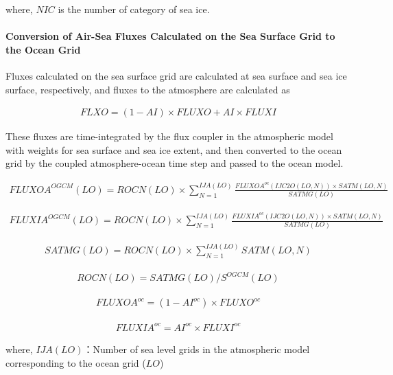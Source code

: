 where, \(NIC\) is the number of category of sea ice.

\hypertarget{conversion-of-air-sea-fluxes-calculated-on-the-sea-surface-grid-to-the-ocean-grid}{%
\paragraph{Conversion of Air-Sea Fluxes Calculated on the Sea Surface
Grid to the Ocean
Grid}\label{conversion-of-air-sea-fluxes-calculated-on-the-sea-surface-grid-to-the-ocean-grid}}

Fluxes calculated on the sea surface grid are calculated at sea surface
and sea ice surface, respectively, and fluxes to the atmosphere are
calculated as

\begin{eqnarray} FLXO=(1-AI) \times FLUXO+AI \times FLUXI \end{eqnarray}

These fluxes are time-integrated by the flux coupler in the atmospheric
model with weights for sea surface and sea ice extent, and then
converted to the ocean grid by the coupled atmosphere-ocean time step
and passed to the ocean model.

\begin{eqnarray} FLUXOA^{OGCM}(LO) = ROCN(LO) \times \sum_{N=1}^{IJA(LO)} \frac{FLUXOA^{oc}(IJC2O(LO,N)) \times SATM(LO,N)}{SATMG(LO)} \end{eqnarray}

\begin{eqnarray} FLUXIA^{OGCM}(LO) = ROCN(LO) \times \sum_{N=1}^{IJA(LO)} \frac{FLUXIA^{oc}(IJC2O(LO,N)) \times SATM(LO,N)}{SATMG(LO)} \end{eqnarray}

\begin{eqnarray} SATMG(LO)=ROCN(LO) \times \sum_{N=1}^{IJA(LO)} SATM(LO,N) \end{eqnarray}

\begin{eqnarray} ROCN(LO)=SATMG(LO)/S^{OGCM}(LO) \end{eqnarray}

\begin{eqnarray} FLUXOA^{oc}=(1-AI^{oc}) \times FLUXO^{oc} \end{eqnarray}

\begin{eqnarray} FLUXIA^{oc}=AI^{oc} \times FLUXI^{oc} \end{eqnarray}

where, \(IJA(LO)\)：Number of sea level grids in the atmospheric model
corresponding to the ocean grid (\(LO\))

